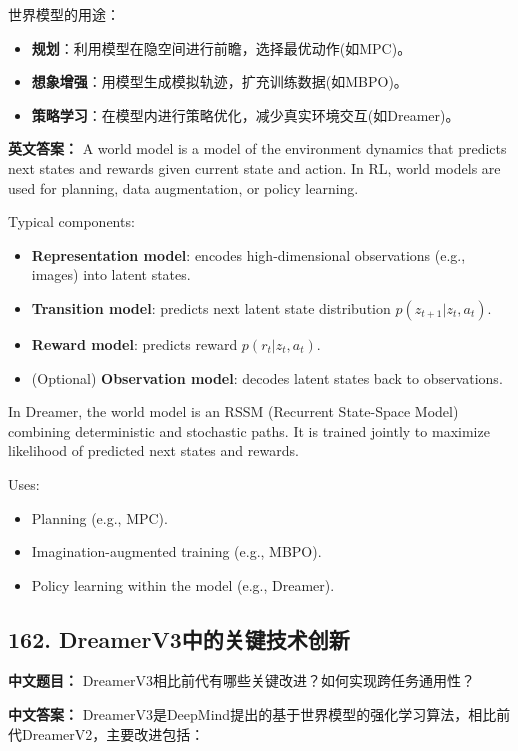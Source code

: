 \documentclass[10pt,a4paper]{ctexart}
\begin{document}
世界模型的用途：
\begin{itemize}
    \item \textbf{规划}：利用模型在隐空间进行前瞻，选择最优动作(如MPC)。
    \item \textbf{想象增强}：用模型生成模拟轨迹，扩充训练数据(如MBPO)。
    \item \textbf{策略学习}：在模型内进行策略优化，减少真实环境交互(如Dreamer)。
\end{itemize}

\textbf{英文答案：}  
A world model is a model of the environment dynamics that predicts next states and rewards given current state and action. In RL, world models are used for planning, data augmentation, or policy learning.

Typical components:
\begin{itemize}
    \item \textbf{Representation model}: encodes high-dimensional observations (e.g., images) into latent states.
    \item \textbf{Transition model}: predicts next latent state distribution $p(z_{t+1} | z_t, a_t)$.
    \item \textbf{Reward model}: predicts reward $p(r_t | z_t, a_t)$.
    \item (Optional) \textbf{Observation model}: decodes latent states back to observations.
\end{itemize}

In Dreamer, the world model is an RSSM (Recurrent State-Space Model) combining deterministic and stochastic paths. It is trained jointly to maximize likelihood of predicted next states and rewards.

Uses:
\begin{itemize}
    \item Planning (e.g., MPC).
    \item Imagination-augmented training (e.g., MBPO).
    \item Policy learning within the model (e.g., Dreamer).
\end{itemize}

\subsection*{162. DreamerV3中的关键技术创新}
\textbf{中文题目：} DreamerV3相比前代有哪些关键改进？如何实现跨任务通用性？

\textbf{中文答案：}  
DreamerV3是DeepMind提出的基于世界模型的强化学习算法，相比前代DreamerV2，主要改进包括：
\end{document}
